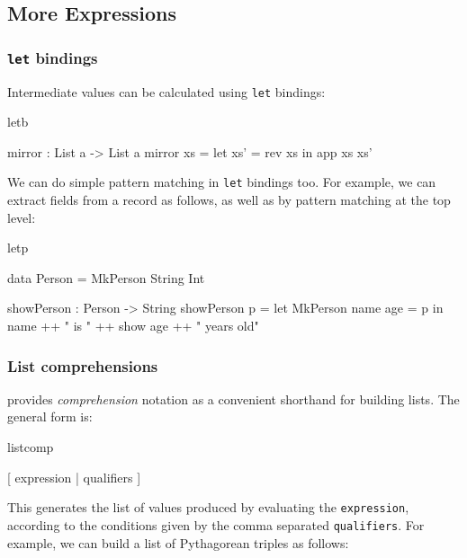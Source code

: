 \subsection{More Expressions}

\subsubsection*{\texttt{let} bindings}

Intermediate values can be calculated using \texttt{let} bindings:

\begin{SaveVerbatim}{letb}

mirror : List a -> List a
mirror xs = let xs' = rev xs in
                app xs xs'

\end{SaveVerbatim}

\noindent
We can do simple pattern matching in \texttt{let} bindings too. For example, we can extract
fields from a record as follows, as well as by pattern matching at the top level:

\begin{SaveVerbatim}{letp}

data Person = MkPerson String Int

showPerson : Person -> String
showPerson p = let MkPerson name age = p in
                   name ++ " is " ++ show age ++ " years old"

\end{SaveVerbatim}

\subsubsection*{List comprehensions}

\label{sec:listcomp}

\Idris{} provides \emph{comprehension} notation as a convenient shorthand for
building lists. The general form is:

\begin{SaveVerbatim}{listcomp}

[ expression | qualifiers ]

\end{SaveVerbatim}

\noindent
This generates the list of values produced by evaluating the
\texttt{expression}, according to the conditions given by the comma separated
\texttt{qualifiers}. For example, we can build a list of Pythagorean triples as
follows:


